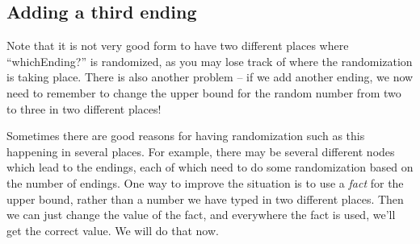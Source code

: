 \documentclass{article}
\begin{document}
\subsection{Adding a third ending}


Note that it is not very good form to have two different places where 
``whichEnding?'' is randomized, as you may lose track of where the 
randomization is taking place. There is also another problem -- if we 
add another ending, we now need to remember to change the upper bound 
for the random number from two to three in two different places!

Sometimes there are good reasons for having randomization such as 
this happening in several places. For example, there may be several 
different nodes which lead to the endings, each of which need to do 
some randomization based on the number of endings. One way to improve 
the situation is to use a \textit{fact} for the upper bound, rather 
than a number we have typed in two different places. Then we can just 
change the value of the fact, and everywhere the fact is used, we'll 
get the correct value. We will do that now.
\end{document}
